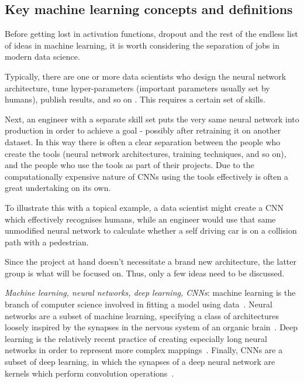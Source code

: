 \subsection{Key machine learning concepts and definitions}
Before getting lost in activation functions, dropout and the rest of the endless list of ideas in machine learning, it is worth considering the separation of jobs in modern data science.

Typically, there are one or more data scientists who design the neural network architecture, tune hyper-parameters (important parameters usually set by humans), publish results, and so on \cite{website:separation_of_ML_roles}. This requires a certain set of skills.

Next, an engineer with a separate skill set puts the very same neural network into production in order to achieve a goal - possibly after retraining it on another dataset. In this way there is often a clear separation between the people who create the tools (neural network architectures, training techniques, and so on), and the people who use the tools as part of their projects. Due to the computationally expensive nature of CNNs \cite{huang2017speed} using the tools effectively is often a great undertaking on its own.

To illustrate this with a topical example, a data scientist might create a CNN which effectively recognises humans, while an engineer would use that same unmodified neural network to calculate whether a self driving car is on a collision path with a pedestrian.

Since the project at hand doesn't necessitate a brand new architecture, the latter group is what will be focused on. Thus, only a few ideas need to be discussed.


\textit{Machine learning, neural networks, deep learning, CNNs}: machine learning is the branch of computer science involved in fitting a model using data~\cite{kohavi1998glossary}. Neural networks are a subset of machine learning, specifying a class of architectures loosely inspired by the synapses in the nervous system of an organic brain~\cite{hopfield1988artificial}. Deep learning is the relatively recent practice of creating especially long neural networks in order to represent more complex mappings~\cite{schmidhuber2015deep}. Finally, CNNs are a subset of deep learning, in which the synapses of a deep neural network are kernels which perform convolution operations~\cite{website:cs231n_CNNs}.

